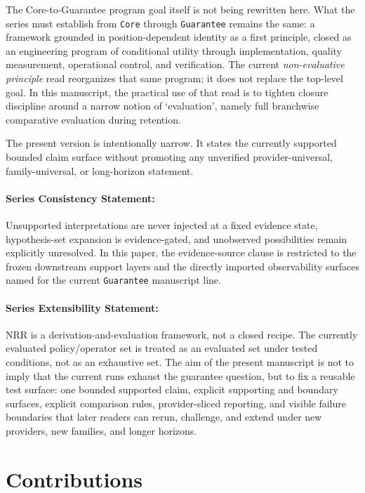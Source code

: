 \documentclass[11pt]{article}
\begin{document}
The Core-to-Guarantee program goal itself is not being rewritten here. What the
series must establish from \texttt{Core} through \texttt{Guarantee} remains the
same: a framework grounded in position-dependent identity as a first principle,
closed as an engineering program of conditional utility through
implementation, quality measurement, operational control, and verification. The
current \textit{non-evaluative principle} read reorganizes that same program; it
does not replace the top-level goal. In this manuscript, the practical use of
that read is to tighten closure discipline around a narrow notion of
`evaluation', namely full branchwise comparative evaluation during retention.

The present version is intentionally narrow. It states the currently supported
bounded claim surface without promoting any unverified provider-universal,
family-universal, or long-horizon statement.

\paragraph{Series Consistency Statement:}
Unsupported interpretations are never injected at a fixed evidence state,
hypothesis-set expansion is evidence-gated, and unobserved possibilities remain
explicitly unresolved. In this paper, the evidence-source clause is restricted to
the frozen downstream support layers and the directly imported observability
surfaces named for the current \texttt{Guarantee} manuscript line.

\paragraph{Series Extensibility Statement:}
NRR is a derivation-and-evaluation framework, not a closed recipe. The currently
evaluated policy/operator set is treated as an evaluated set under tested
conditions, not as an exhaustive set. The aim of the present manuscript is not
to imply that the current runs exhaust the guarantee question, but to fix a
reusable test surface: one bounded supported claim, explicit supporting and
boundary surfaces, explicit comparison rules, provider-sliced reporting, and
visible failure boundaries that later readers can rerun, challenge, and extend
under new providers, new families, and longer horizons.

\section{Contributions}
\end{document}
